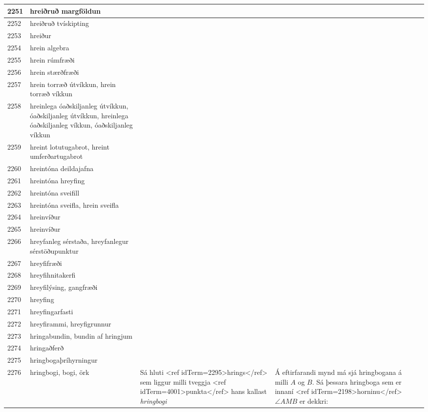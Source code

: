 \begin{longtable}{p{}|p{}|p{}|p{}|p{}}
\hline
2251 & hreiðruð margföldun &  &  &  \\
\hline
2252 & hreiðruð tvískipting &  &  &  \\
\hline
2253 & hreiður &  &  &  \\
\hline
2254 & hrein algebra &  &  &  \\
\hline
2255 & hrein rúmfræði &  &  &  \\
\hline
2256 & hrein stærðfræði &  &  &  \\
\hline
2257 & hrein torræð útvíkkun, hrein torræð víkkun &  &  &  \\
\hline
2258 & hreinlega óaðskiljanleg útvíkkun, óaðskiljanleg útvíkkun, hreinlega óaðskiljanleg víkkun, óaðskiljanleg víkkun &  &  &  \\
\hline
2259 & hreint lotutugabrot, hreint umferðartugabrot &  &  &  \\
\hline
2260 & hreintóna deildajafna &  &  &  \\
\hline
2261 & hreintóna hreyfing &  &  &  \\
\hline
2262 & hreintóna sveifill &  &  &  \\
\hline
2263 & hreintóna sveifla, hrein sveifla &  &  &  \\
\hline
2264 & hreinvíður &  &  &  \\
\hline
2265 & hreinvíður &  &  &  \\
\hline
2266 & hreyfanleg sérstaða, hreyfanlegur sérstöðupunktur &  &  &  \\
\hline
2267 & hreyfifræði &  &  &  \\
\hline
2268 & hreyfihnitakerfi &  &  &  \\
\hline
2269 & hreyfilýsing, gangfræði &  &  &  \\
\hline
2270 & hreyfing &  &  &  \\
\hline
2271 & hreyfingarfasti &  &  &  \\
\hline
2272 & hreyfirammi, hreyfigrunnur &  &  &  \\
\hline
2273 & hringabundin, bundin af hringjum &  &  &  \\
\hline
2274 & hringaðferð &  &  &  \\
\hline
2275 & hringbogaþríhyrningur &  &  &  \\
\hline
2276 & hringbogi, bogi, örk & Sá hluti <ref idTerm=2295>hrings</ref> sem liggur milli tveggja <ref idTerm=4001>punkta</ref> hans kallast \textit{hringbogi} & Á eftirfarandi mynd má sjá hringbogana á milli $A$ og $B$. Sá þessara hringboga sem er innaní <ref idTerm=2198>horninu</ref> $\angle AMB$ er dekkri:


\end{longtable}
